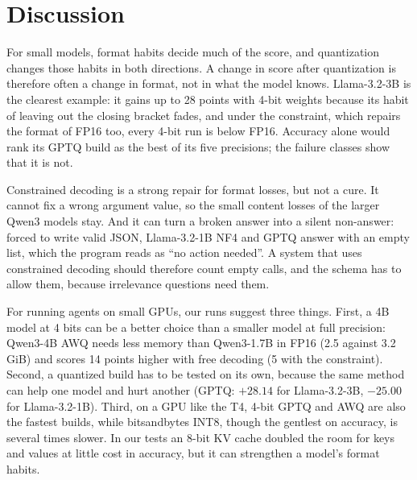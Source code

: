 \documentclass[conference]{IEEEtran}
\begin{document}
\section{Discussion}
For small models, format habits decide much of the score, and quantization changes those habits in both directions.
A change in score after quantization is therefore often a change in format, not in what the model knows. Llama-3.2-3B
is the clearest example: it gains up to 28 points with 4-bit weights because its habit of leaving out the closing
bracket fades, and under the constraint, which repairs the format of FP16 too, every 4-bit run is below FP16.
Accuracy alone would rank its GPTQ build as the best of its five precisions; the failure classes show that it is not.

Constrained decoding is a strong repair for format losses, but not a cure. It cannot fix a wrong argument value,
so the small content losses of the larger Qwen3 models stay. And it can turn a broken answer into a silent
non-answer: forced to write valid JSON, Llama-3.2-1B NF4 and GPTQ answer with an empty list, which the program
reads as ``no action needed''. A system that uses constrained decoding should therefore count empty calls, and the
schema has to allow them, because irrelevance questions need them.

For running agents on small GPUs, our runs suggest three things. First, a 4B model at 4 bits can be a better choice
than a smaller model at full precision: Qwen3-4B AWQ needs less memory than Qwen3-1.7B in FP16 (2.5 against
3.2\,GiB) and scores 14 points higher with free decoding (5 with the constraint).
Second, a quantized build has to be tested on its own, because the same
method can help one model and hurt another (GPTQ: $+28.14$ for Llama-3.2-3B, $-25.00$ for Llama-3.2-1B). Third, on
a GPU like the T4, 4-bit GPTQ and AWQ are also the fastest builds, while bitsandbytes INT8, though the gentlest
on accuracy, is several times slower. In our tests an 8-bit KV cache doubled the room for keys and values at little cost in
accuracy, but it can strengthen a model's format habits.
\end{document}
